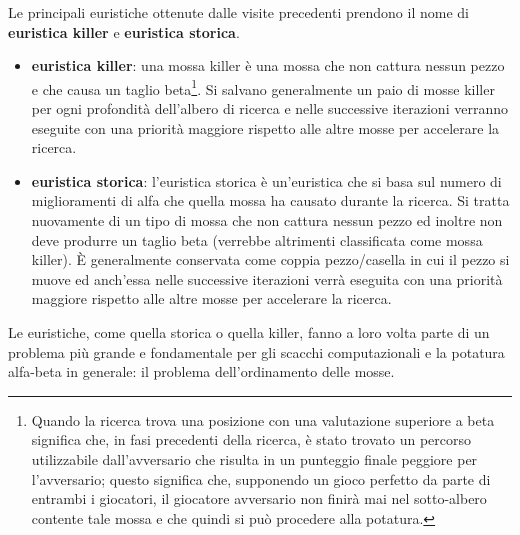 Le principali euristiche ottenute dalle visite precedenti prendono il nome di \textbf{euristica killer} e \textbf{euristica storica}.
\begin{itemize}
  \item  \textbf{euristica killer}: una mossa killer è una mossa che non cattura nessun pezzo e che causa un taglio beta\footnote{Quando la ricerca trova 
  una posizione con una valutazione  superiore a beta significa che, in fasi precedenti della ricerca, è stato trovato un percorso utilizzabile 
   dall'avversario che risulta in un punteggio finale peggiore per l'avversario; questo significa che, supponendo un gioco
   perfetto da parte di entrambi i giocatori, il giocatore avversario non finirà mai nel sotto-albero contente tale mossa e che quindi si 
   può procedere alla potatura.}. Si salvano generalmente un paio di mosse killer per ogni profondità dell'albero di ricerca e nelle successive iterazioni
   verranno eseguite con una priorità maggiore rispetto alle altre mosse per accelerare la ricerca. 
  \item \textbf{euristica storica}: l'euristica storica è un'euristica che si basa sul numero di miglioramenti di alfa che quella mossa ha causato
   durante la ricerca. Si tratta nuovamente di un tipo di mossa che non cattura nessun pezzo ed inoltre non deve produrre un taglio beta
  (verrebbe altrimenti classificata come mossa killer). È generalmente conservata come coppia pezzo/casella in cui il pezzo si muove 
  ed anch'essa  nelle successive iterazioni verrà eseguita con una priorità maggiore rispetto alle altre mosse per accelerare la ricerca. 
\end{itemize} 
Le euristiche, come quella storica o quella killer, fanno a loro volta parte di un problema più grande e fondamentale per gli scacchi computazionali 
e la potatura alfa-beta in generale: il problema dell'ordinamento delle mosse.


